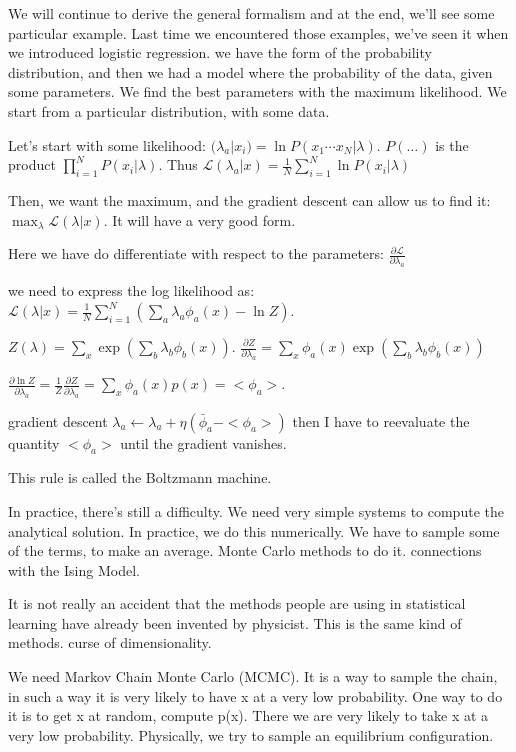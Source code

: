 \documentclass[a4paper]{tufte-book}
\newcommand{\nth}{\frac{1}{N}}
\newcommand{\sumin}{\sum_{i=1}^N}
\begin{document}
We will continue to derive the general formalism and at the end, we'll see some 
particular example.
Last time we encountered those examples, we've seen it when we introduced
logistic regression. we have the form of the probability distribution, and then
we had a model where the probability of the data, given some parameters.
We find the best parameters with the maximum likelihood. We start from a
particular distribution, with some data.

Let's start with some likelihood:
$\mathcal(\lambda_a|x_i) = \ln P(x_1\cdots x_N | \lambda)$.
$P(\dots)$ is the product $\prod_{i=1}^N P(x_i|\lambda)$.
Thus $\mathcal{L}(\lambda_a|x) = \nth \sumin \ln P(x_i|\lambda)$

Then, we want the maximum, and the gradient descent can allow us to find it:
$\max_\lambda \mathcal{L} (\lambda | x)$.
It will have a very good form.

Here we have do differentiate with respect to the parameters:
$\frac{\partial \mathcal{L}}{\partial \lambda_a}$

we need to express the log likelihood as:
$\mathcal{L}(\lambda|x) = \nth \sumin (\sum_a \lambda_a \phi_a(x) - \ln Z)$.

$Z(\lambda) = \sum_x \exp (\sum_b \lambda_b \phi_b (x))$.
$\frac{\partial Z}{\partial \lambda_a} = \sum_x \phi_a(x) \exp (\sum_b \lambda_b \phi_b(x))$

$\frac{\partial \ln Z}{\partial \lambda_a} = \frac{1}{Z} \frac{\partial Z}{\partial \lambda_a} = \sum_x \phi_a (x) p(x) = <\phi_a>$.

gradient descent $\lambda_a \leftarrow \lambda_a + \eta (\bar\phi_a - <\phi_a>)$
then I have to reevaluate the quantity $<\phi_a>$ until the gradient vanishes.

This rule is called the Boltzmann machine.

In practice, there's still a difficulty. We need very simple systems to compute
the analytical solution. In practice, we do this numerically. We have to sample
some of the terms, to make an average.
Monte Carlo methods to do it. connections with the Ising Model.

It is not really an accident that the methods people are using in statistical
learning have already been invented by physicist. This is the same kind of
methods.
curse of dimensionality.

We need Markov Chain Monte Carlo (MCMC).
It is a way to sample the chain, in such a way
it is very likely to have x at a very low probability. One way to do it is to
get x at random, compute p(x). There we are very likely to take x at a very low
probability.
Physically, we try to sample an equilibrium configuration.
\end{document}
